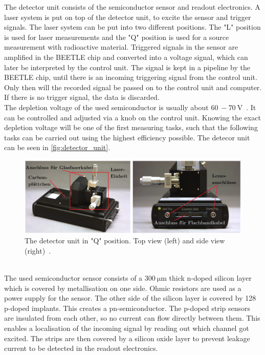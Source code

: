 The detector unit consists of the semiconductor sensor and readout electronics. A laser system is put on top
of the detector unit, to excite the sensor and trigger signals. The laser system can be put into two different
positions. The "L" position is used for laser measurements and the "Q" position is used for a source measurement
with radioactive material. Triggered signals in the sensor are
amplified in the BEETLE chip and converted into a voltage signal, which can later be interpreted by the control unit.
The signal is kept in a pipeline by the BEETLE chip, until there is an incoming triggering signal from the control unit. Only then will the recorded signal
be passed on to the control unit and computer. If there is no trigger signal, the data is discarded.\\
The depletion voltage of the used semiconductor is usually about $\qty{60}{} -  \qty{70}{\volt}$~\cite{SiliconStrip}. It can be controlled and adjusted
via a knob on the control unit. Knowing the exact depletion voltage will be one of the first measuring tasks, such that the following
tasks can be carried out using the highest efficiency possible. The detecor unit can be seen in \autoref{fig:detector_unit}.
\begin{figure}
    \centering
    \includegraphics[width = .8\textwidth]{content/pics/detector_unit.png}
    \caption{The detector unit in "Q" position. Top view (left) and side view (right)~\cite{SiliconStrip}.}
    \label{fig:detector_unit}
\end{figure}\\
The used semiconductor sensor consists of a $\qty{300}{\micro\metre}$ thick n-doped silicon layer which is covered by metallisation
on one side. Ohmic resistors are used as a power supply for the sensor. The other side of the silicon layer is covered
by 128 p-doped implants. This creates a pn-semiconductor. The p-doped strip sensors are insulated from each other, so
no current can flow directly between them. This enables a localisation of the incoming signal by reading out which
channel got excited. The strips are then covered by a silicon oxide layer to prevent leakage current to be detected in the readout electronics.

